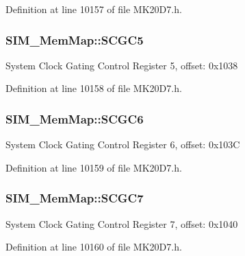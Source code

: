 Definition at line 10157 of file M\+K20\+D7.\+h.

\subsubsection[{\texorpdfstring{S\+C\+G\+C5}{SCGC5}}]{ S\+I\+M\+\_\+\+Mem\+Map\+::\+S\+C\+G\+C5}\hypertarget{struct_s_i_m___mem_map_ae9d560d3862eb171c739acaf92daa8aa}{}\label{struct_s_i_m___mem_map_ae9d560d3862eb171c739acaf92daa8aa}
System Clock Gating Control Register 5, offset\+: 0x1038 

Definition at line 10158 of file M\+K20\+D7.\+h.

\subsubsection[{\texorpdfstring{S\+C\+G\+C6}{SCGC6}}]{ S\+I\+M\+\_\+\+Mem\+Map\+::\+S\+C\+G\+C6}\hypertarget{struct_s_i_m___mem_map_ad40dd833ac37056f5341b692039a5f10}{}\label{struct_s_i_m___mem_map_ad40dd833ac37056f5341b692039a5f10}
System Clock Gating Control Register 6, offset\+: 0x103C 

Definition at line 10159 of file M\+K20\+D7.\+h.

\subsubsection[{\texorpdfstring{S\+C\+G\+C7}{SCGC7}}]{ S\+I\+M\+\_\+\+Mem\+Map\+::\+S\+C\+G\+C7}\hypertarget{struct_s_i_m___mem_map_aa35362a8c756eedb82b8cf00f98c43da}{}\label{struct_s_i_m___mem_map_aa35362a8c756eedb82b8cf00f98c43da}
System Clock Gating Control Register 7, offset\+: 0x1040 

Definition at line 10160 of file M\+K20\+D7.\+h.

